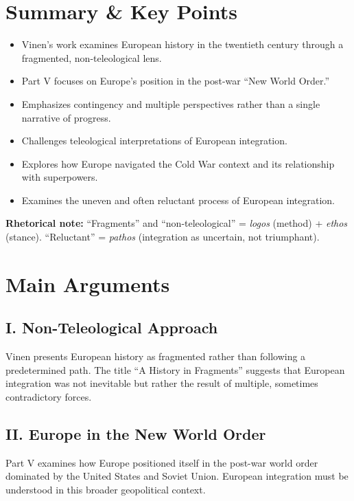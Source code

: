 \documentclass[11pt,a4paper]{article}
\begin{document}
\section*{Summary \& Key Points}

\begin{itemize}
\item Vinen's work examines European history in the twentieth century through a fragmented, non-teleological lens.
\item Part V focuses on Europe's position in the post-war ``New World Order.''
\item Emphasizes contingency and multiple perspectives rather than a single narrative of progress.
\item Challenges teleological interpretations of European integration.
\item Explores how Europe navigated the Cold War context and its relationship with superpowers.
\item Examines the uneven and often reluctant process of European integration.
\end{itemize}

\textbf{Rhetorical note:} ``Fragments'' and ``non-teleological'' = \textit{logos} (method) + \textit{ethos} (stance). ``Reluctant'' = \textit{pathos} (integration as uncertain, not triumphant).

\section*{Main Arguments}

\subsection*{I. Non-Teleological Approach}

Vinen presents European history as fragmented rather than following a predetermined path. The title ``A History in Fragments'' suggests that European integration was not inevitable but rather the result of multiple, sometimes contradictory forces.

\subsection*{II. Europe in the New World Order}

Part V examines how Europe positioned itself in the post-war world order dominated by the United States and Soviet Union. European integration must be understood in this broader geopolitical context.
\end{document}
